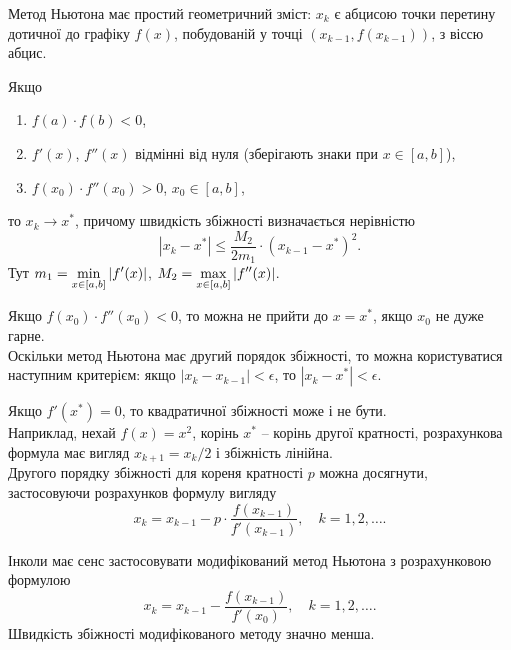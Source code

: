 Метод Ньютона має простий геометричний зміст: $x_k$ є абцисою точки перетину дотичної до графіку $f(x)$, побудованій у точці $(x_{k-1}, f(x_{k-1}))$, з віссю абцис.

\begin{theorem}
	\label{th:1}
	Якщо
	\begin{enumerate}
		\item $f(a) \cdot f(b) < 0$,
		\item $f'(x)$, $f''(x)$ відмінні від нуля (зберігають знаки при $x \in [a, b]$),
		\item $f(x_0) \cdot f''(x_0) > 0$, $x_0 \in [a, b]$,
	\end{enumerate}
	то $x_k \to x^*$, причому швидкість збіжності визначається нерівністю
	\[ |x_k - x^*| \le \frac{M_2}{2m_1} \cdot (x_{k-1} - x^*)^2. \]
	Тут $m_1 = \displaystyle\min\limits_{x \in [a, b]} |f'(x)|$, $M_2 = \displaystyle\max\limits_{x \in [a, b]} |f''(x)|$.
\end{theorem}

Якщо $f(x_0) \cdot f''(x_0) < 0$, то можна не прийти до $x = x^*$, якщо $x_0$ не дуже гарне. \\

Оскільки метод Ньютона має другий порядок збіжності, то можна користуватися наступним критерієм: якщо $|x_k - x_{k-1}| < \epsilon$, то $|x_k - x^*| < \epsilon$.
\begin{remark}
	Якщо $f'(x^*) = 0$, то квадратичної збіжності може і не бути. \\

	Наприклад, нехай $f(x) = x^2$, корінь $x^*$ -- корінь другої кратності, розрахункова формула має вигляд $x_{k+1} = x_k / 2$ і збіжність лінійна. \\

	Другого порядку збіжності для кореня кратності $p$ можна досягнути, застосовуючи розрахунков формулу вигляду
	\begin{equation}
		\label{eq:4}
		x_k = x_{k-1} - p \cdot \frac{f(x_{k-1})}{f'(x_{k-1})}, \quad k = 1, 2, \ldots .
	\end{equation}
\end{remark}

\begin{remark}
	Інколи має сенс застосовувати модифікований метод Ньютона з розрахунковою формулою
	\begin{equation}
		\label{eq:5}
		x_k = x_{k-1} - \frac{f(x_{k-1})}{f'(x_0)}, \quad k = 1, 2, \ldots .
	\end{equation}
	Швидкість збіжності модифікованого методу значно менша.
\end{remark}

